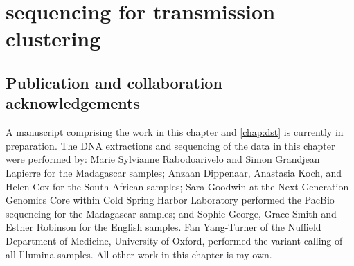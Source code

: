 
\chapter{\ont{} sequencing for \mtb{} transmission clustering}
\label{chap:clustering}

\ifpdf
    \graphicspath{{Chapter2/Figs/Raster/}{Chapter2/Figs/PDF/}{Chapter2/Figs/}}
\else
    \graphicspath{{Chapter2/Figs/Vector/}{Chapter2/Figs/}}
\fi


\setcounter{section}{-1}
\section{Publication and collaboration acknowledgements}
\label{sec:ch2-acknowledge}

A manuscript comprising the work in this chapter and \autoref{chap:dst} is currently in preparation. The DNA extractions and sequencing of the data in this chapter were performed by: Marie Sylvianne Rabodoarivelo and Simon Grandjean Lapierre for the Madagascar samples; Anzaan Dippenaar, Anastasia Koch, and Helen Cox for the South African samples; Sara Goodwin at the Next Generation Genomics Core within Cold Spring Harbor Laboratory performed the PacBio sequencing for the Madagascar samples; and Sophie George, Grace Smith and Esther Robinson for the English samples. Fan Yang-Turner of the Nuffield Department of Medicine, University of Oxford, performed the variant-calling of all Illumina samples. All other work in this chapter is my own.



